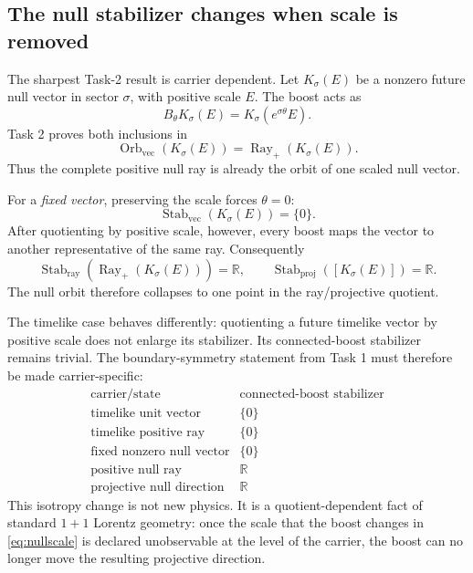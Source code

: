 \documentclass[11pt,a4paper]{article}
\newcommand{\R}{\mathbb{R}}
\newcommand{\Stab}{\operatorname{Stab}}
\newcommand{\Orb}{\operatorname{Orb}}
\newcommand{\Rayp}{\operatorname{Ray}_{+}}
\begin{document}
\subsection{The null stabilizer changes when scale is removed}

The sharpest Task-2 result is carrier dependent.  Let $K_\sigma(E)$ be a nonzero future null vector in sector $\sigma$, with positive scale $E$.  The boost acts as
\begin{equation}
 B_\theta K_\sigma(E)=K_\sigma(e^{\sigma\theta}E).
\label{eq:nullscale}
\end{equation}
Task 2 proves both inclusions in
\begin{equation}
 \Orb_{\mathrm{vec}}(K_\sigma(E))
 =\Rayp(K_\sigma(E)).
\label{eq:orbitray}
\end{equation}
Thus the complete positive null ray is already the orbit of one scaled null vector.

For a \emph{fixed vector}, preserving the scale forces $\theta=0$:
\begin{equation}
 \Stab_{\mathrm{vec}}(K_\sigma(E))=\{0\}.
\end{equation}
After quotienting by positive scale, however, every boost maps the vector to another representative of the same ray.  Consequently
\begin{equation}
 \Stab_{\mathrm{ray}}(\Rayp(K_\sigma(E)))=\R,
 \qquad
 \Stab_{\mathrm{proj}}([K_\sigma(E)])=\R.
\label{eq:stabjump}
\end{equation}
The null orbit therefore collapses to one point in the ray/projective quotient.

The timelike case behaves differently: quotienting a future timelike vector by positive scale does not enlarge its stabilizer.  Its connected-boost stabilizer remains trivial.  The boundary-symmetry statement from Task 1 must therefore be made carrier-specific:
\begin{equation}
\begin{array}{c|c}
\text{carrier/state} & \text{connected-boost stabilizer}\\
\hline
\text{timelike unit vector} & \{0\}\\
\text{timelike positive ray} & \{0\}\\
\text{fixed nonzero null vector} & \{0\}\\
\text{positive null ray} & \R\\
\text{projective null direction} & \R
\end{array}
\end{equation}
This isotropy change is not new physics.  It is a quotient-dependent fact of standard $1+1$ Lorentz geometry: once the scale that the boost changes in \eqref{eq:nullscale} is declared unobservable at the level of the carrier, the boost can no longer move the resulting projective direction.
\end{document}

